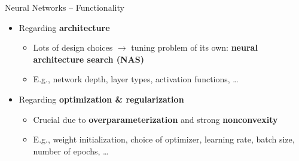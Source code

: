 \begin{frame}{Neural Networks -- Functionality}
\begin{itemize}
  \item Regarding \textbf{architecture}
  \begin{itemize}
    \item Lots of design choices $\rightarrow$ tuning problem of its own: 
    \textbf{neural architecture search (NAS)}
    \item E.g., network depth, layer types, activation functions, \dots
  \end{itemize}
  \item Regarding \textbf{optimization \& regularization}
  \begin{itemize}
    \item Crucial due to \textbf{overparameterization} and strong 
    \textbf{nonconvexity} 
    \item E.g., weight initialization, choice of optimizer, learning rate, 
    batch size, number of epochs, \dots
  \end{itemize}
\end{itemize}

\medskip


\end{frame}


